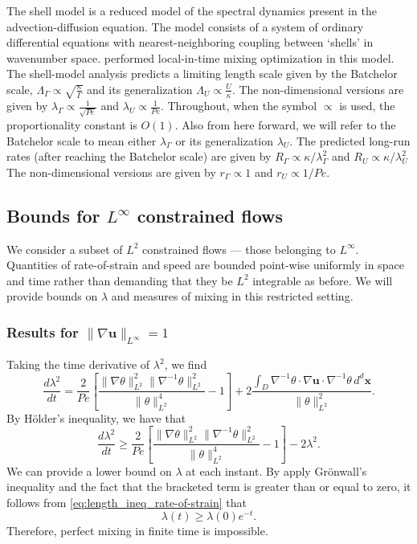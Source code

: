\documentclass{jfm}
\newcommand{\ddt}[1]{\frac{d #1}{dt}}
\newcommand{\hmone}[1]{\|\nabla^{-1} #1\|_{L^{2}}}
\newcommand{\ltwo}[1]{\|#1\|_{L^{2}}}
\newcommand{\hone}[1]{\| \nabla #1\|_{L^{2}}}
\newcommand{\sint}[1]{\int_{D} #1 \, d^{d}\mathbf{x}}
\renewcommand{\vec}[1]{\mathbf{#1}}
\newcommand{\linf}[1]{\| #1 \|_{L^{\infty}}}
\begin{document}
The shell model is a reduced model of the spectral dynamics present in the advection-diffusion equation. The model consists of a system of ordinary differential equations with nearest-neighboring coupling between `shells' in wavenumber space. \cite{Miles2017a} performed local-in-time mixing optimization in this model. The shell-model analysis predicts a limiting length scale given by the Batchelor scale, $\Lambda_{\Gamma} \propto\sqrt{\frac{\kappa}{\Gamma}}$  and its generalization $\Lambda_{U} \propto \frac{U}{\kappa} $. The non-dimensional versions are given by $\lambda_{\Gamma} \propto \frac{1}{\sqrt{Pe}}$ and $\lambda_{U} \propto\frac{1}{Pe}$. Throughout, when the symbol $\propto $ is used, the proportionality constant is $O(1)$. Also from here forward, we will refer to the Batchelor scale to mean either $\lambda_{\Gamma}$ or its generalization $\lambda_{U}$.  The predicted long-run rates (after reaching the Batchelor scale) are given by $R_{\Gamma} \propto \kappa/\lambda_{\Gamma}^2 $  and  $R_{U}\propto \kappa/\lambda_{U}^2$  The non-dimensional versions are given by $r_{\Gamma} \propto 1$ and $r_{U} \propto 1/Pe $.

\subsection{Bounds for $L^{\infty}$ constrained flows}
We consider a subset of $L^{2}$ constrained flows --- those belonging to $L^{\infty}$. Quantities of rate-of-strain and speed are bounded point-wise uniformly in space and time rather than demanding that they be $L^2$ integrable as before. We will provide bounds on $\lambda$ and measures of mixing in this restricted setting. 

\label{sec:linfty_flows}
\subsubsection{Results for $\linf{\nabla \vec{u}} = 1$}

Taking the time derivative of $\lambda^2$, we find
%
\begin{equation}
	\ddt{\lambda^2} = \frac{2}{Pe}
		\left[ 
			\frac{\hone{\theta}^2\hmone{\theta}^2}
					{\ltwo{\theta}^4}  
			- 1
		\right]
		+ 2 \frac{\sint{\nabla^{-1}\theta \cdot \nabla\vec{u} \cdot 
							\nabla^{-1}\theta  }}
					  {\ltwo{\theta}^{2}}.
\end{equation}
By H\"older's inequality, we have that
\begin{equation}
\label{eq:length_ineq_rate-of-strain}
	\ddt{\lambda^2} \geq \frac{2}{Pe} \left[ 
			\frac{\hone{\theta}^2\hmone{\theta}^2}
					{\ltwo{\theta}^4}  
			- 1
		\right] - 2  \lambda^2 .
\end{equation}
We can provide a lower bound on $\lambda$ at each instant. By apply Gr\"onwall's inequality and the fact that the bracketed term is greater than or equal to zero, it follows from \eqref{eq:length_ineq_rate-of-strain} that
%
\begin{equation}
\label{eq:exponential_enstrophy}
	\lambda (t) \geq \lambda(0)e^{- t}.
\end{equation}
%
Therefore, perfect mixing in finite time is impossible.
\end{document}
